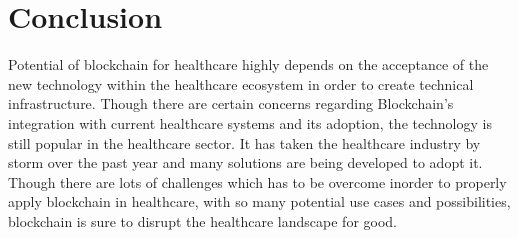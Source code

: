 \documentclass[12pt]{report}
\begin{document}
\chapter{Conclusion}
Potential of blockchain for healthcare highly depends on the acceptance of the new technology within the healthcare ecosystem in order to create technical infrastructure. Though there are certain concerns regarding Blockchain’s integration with current healthcare systems and its adoption, the technology is still popular in the healthcare sector. It has taken the healthcare industry by storm over the past year and many solutions are being developed to adopt it. Though there are lots of challenges which has to be overcome inorder to properly apply blockchain in healthcare, with so many potential use cases and possibilities, blockchain is sure to disrupt the healthcare landscape for good.


\end{document}
